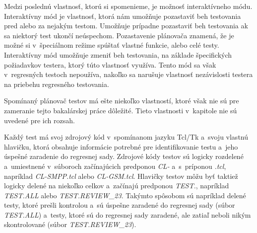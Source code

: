 Medzi poslednú vlastnosť, ktorú si spomenieme, je možnosť interaktívneho módu.
Interaktívny mód je vlastnosť, ktorá nám umožňuje pozastaviť beh testovania pred alebo za nejakým testom.
Umožňuje prípadne pozastaviť beh testovania ak sa niektorý test ukončí neúspechom. Pozastavenie plánovača znamená,
že je možné si v~špeciálnom režime spúštať vlastné funkcie, alebo celé testy.
Interaktívny mód umožňuje zmeniť beh testovania, na základe špecifických požiadavkov testera, ktorý túto vlastnosť využíva.
Tento mód sa však v~regresných testoch nepoužíva, nakoľko sa narušuje vlastnosť nezávislosti testera na priebehu regresného testovania.

Spomínaný plánovač testov má ešte niekoľko vlastností, ktoré však nie sú
pre zameranie tejto bakalárskej práce dôležité. Tieto vlastnosti
v~kapitole nie sú uvedené pre ich rozsah. 

Každý test má svoj zdrojový kód v~spomínanom jazyku Tcl/Tk a~svoju vlastnú hlavičku, ktorá obsahuje informácie potrebné pre identifikovanie testu a~jeho úspešné zaradenie do regresnej sady.
Zdrojové kódy testov sú logicky rozdelené a~umiestnené v~súboroch začínajúcich predponou \emph{CL-} a~s~príponou \emph{.tcl}, napríklad \emph{CL-SMPP.tcl} alebo \emph{CL-GSM.tcl}.
Hlavičky testov môžu byť taktiež logicky delené na niekoľko celkov a~začínajú predponou \emph{TEST.}, napríklad \emph{TEST.ALL} alebo \emph{TEST.REVIEW\_23}.
Takýmto spôsobom sú napríklad delené testy, ktoré prešli kontrolou a~sú úspešne zaradené do regresnej sady (súbor \emph{TEST.ALL}) a~testy, ktoré sú do regresnej sady zaradené, ale
zatiaľ neboli nikým skontrolované (súbor \emph{TEST.REVIEW\_23}).

